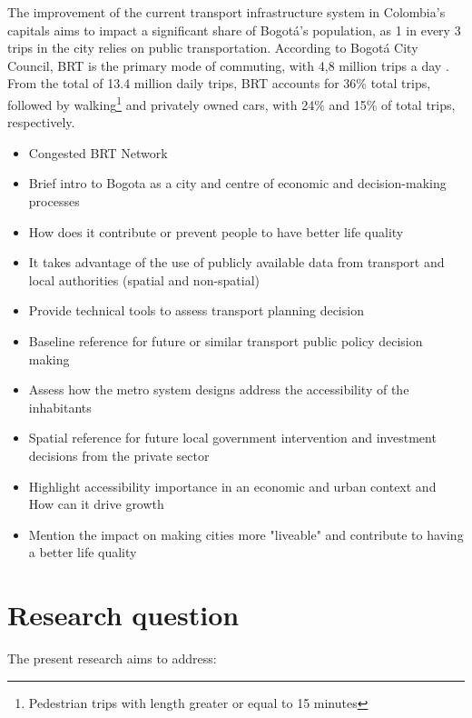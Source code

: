 \documentclass[12pt, a4paper]{report}
\begin{document}
The improvement of the current transport infrastructure system in Colombia's capitals aims to impact a significant share of Bogot\'{a}'s population, as 1 in every 3 trips in the city relies on public transportation. According to Bogot\'{a} City Council, BRT is the primary mode of commuting, with 4,8 million trips a day \citep{alcaldiadebogotad.c.EncuestaMovilidad20192019}. From the total of 13.4 million daily trips, BRT accounts for 36\% total trips, followed by walking\footnote{Pedestrian trips with length greater or equal to 15 minutes} and privately owned cars, with 24\% and 15\% of total trips, respectively.



\begin{itemize}

\item Congested BRT Network

\item Brief intro to Bogota as a city and centre of economic and decision-making processes
\item How does it contribute or prevent people to have better life quality
\item It takes advantage of the use of publicly available data from transport and local authorities (spatial and non-spatial)
  \item Provide technical tools to assess transport planning decision
  \item Baseline reference for future or similar transport public policy decision making
  \item Assess how the metro system designs address the accessibility of the inhabitants
  \item Spatial reference for future local government intervention and investment decisions from the private sector
  \item Highlight accessibility importance in an economic and urban context and How can it drive growth
  \item Mention the impact on making cities more "liveable" and contribute to having a better life quality
\end{itemize}

\section{Research question}

The present research aims to address:



\end{document}
